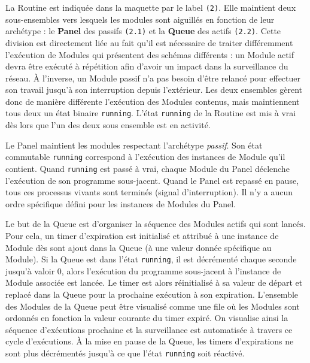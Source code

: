 \documentclass[]{article}
\begin{document}
\par La Routine est indiquée dans la maquette par le label \texttt{(2)}. Elle maintient deux sous-ensembles vers lesquels les modules sont aiguillés en fonction de leur archétype : le \textbf{Panel} des passifs \texttt{(2.1)} et la \textbf{Queue} des actifs \texttt{(2.2)}. Cette division est directement liée au fait qu'il est nécessaire de traiter différemment l'exécution de Modules qui présentent des schémas différents : un Module actif devra être exécuté à répétition afin d'avoir un impact dans la surveillance du réseau. À l'inverse, un Module passif n'a pas besoin d'être relancé pour effectuer son travail jusqu'à son interruption depuis l'extérieur. Les deux ensembles gèrent donc de manière différente l'exécution des Modules contenus, mais maintiennent tous deux un état binaire \texttt{running}. L'état \texttt{running} de la Routine est mis à vrai dès lors que l'un des deux sous ensemble est en activité.\\

\par Le Panel maintient les modules respectant l'archétype \textit{passif}. Son état commutable \texttt{running} correspond à l'exécution des instances de Module qu'il contient. Quand \texttt{running} est passé à vrai, chaque Module du Panel déclenche l'exécution de son programme sous-jacent. Quand le Panel est repassé en pause, tous ces processus vivants sont terminés (signal d'interruption). Il n'y a aucun ordre spécifique défini pour les instances de Modules du Panel.\\

\par Le but de la Queue est d'organiser la séquence des Modules actifs qui sont lancés. Pour cela, un timer d'expiration est initialisé et attribué à une instance de Module dès sont ajout dans la Queue (à une valeur donnée spécifique au Module). Si la Queue est dans l'état \texttt{running}, il est décrémenté chaque seconde jusqu'à valoir 0, alors l'exécution du programme sous-jacent à l'instance de Module associée est lancée. Le timer est alors réinitialisé à sa valeur de départ et replacé dans la Queue pour la prochaine exécution à son expiration. L'ensemble des Modules de la Queue peut être visualisé comme une file où les Modules sont ordonnés en fonction la valeur courante du timer expiré. On visualise ainsi la séquence d'exécutions prochaine et la surveillance est automatisée à travers ce cycle d'exécutions. À la mise en pause de la Queue, les timers d'expirations ne sont plus décrémentés jusqu'à ce que l'état \texttt{running} soit réactivé.\\
\end{document}
